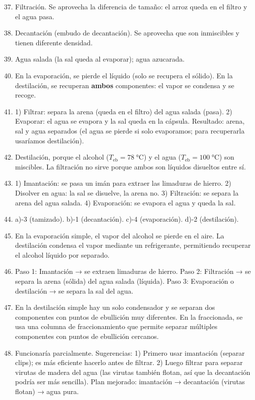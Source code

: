 \documentclass[12pt, letterpaper]{article}
\begin{document}
  \begin{enumerate}[leftmargin=*, label=\textbf{\arabic*.}]
    \setcounter{enumi}{36}
    \item Filtración. Se aprovecha la diferencia de tamaño: el arroz queda en el filtro y el agua pasa.

    \item Decantación (embudo de decantación). Se aprovecha que son inmiscibles y tienen diferente densidad.

    \item Agua salada (la sal queda al evaporar); agua azucarada.

    \item En la evaporación, se pierde el líquido (solo se recupera el sólido). En la destilación, se recuperan \textbf{ambos} componentes: el vapor se condensa y se recoge.

    \item 1) Filtrar: separa la arena (queda en el filtro) del agua salada (pasa). 2) Evaporar: el agua se evapora y la sal queda en la cápsula. Resultado: arena, sal y agua separados (el agua se pierde si solo evaporamos; para recuperarla usaríamos destilación).

    \item Destilación, porque el alcohol ($T_{\text{eb}} = 78\;°$C) y el agua ($T_{\text{eb}} = 100\;°$C) son miscibles. La filtración no sirve porque ambos son líquidos disueltos entre sí.

    \item 1) Imantación: se pasa un imán para extraer las limaduras de hierro. 2) Disolver en agua: la sal se disuelve, la arena no. 3) Filtración: se separa la arena del agua salada. 4) Evaporación: se evapora el agua y queda la sal.

    \item a)-3 (tamizado). b)-1 (decantación). c)-4 (evaporación). d)-2 (destilación).

    \item En la evaporación simple, el vapor del alcohol se pierde en el aire. La destilación condensa el vapor mediante un refrigerante, permitiendo recuperar el alcohol líquido por separado.

    \item Paso 1: Imantación → se extraen limaduras de hierro. Paso 2: Filtración → se separa la arena (sólida) del agua salada (líquida). Paso 3: Evaporación o destilación → se separa la sal del agua.

    \item En la destilación simple hay un solo condensador y se separan dos componentes con puntos de ebullición muy diferentes. En la fraccionada, se usa una columna de fraccionamiento que permite separar múltiples componentes con puntos de ebullición cercanos.

    \item Funcionaría parcialmente. Sugerencias: 1) Primero usar imantación (separar clips); es más eficiente hacerlo antes de filtrar. 2) Luego filtrar para separar virutas de madera del agua (las virutas también flotan, así que la decantación podría ser más sencilla). Plan mejorado: imantación → decantación (virutas flotan) → agua pura.
  \end{enumerate}

\fi
\end{document}
